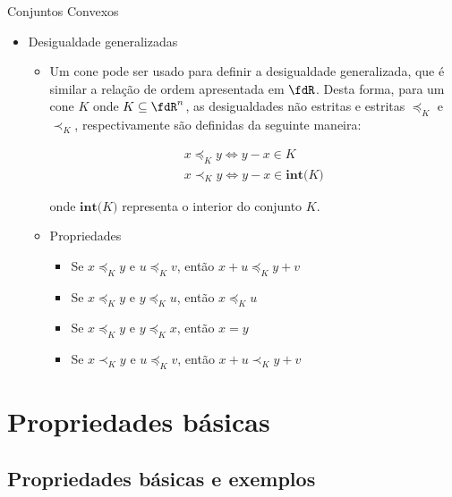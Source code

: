 \begin{frame}{Conjuntos Convexos}
  
  \begin{itemize} 
    \item Desigualdade generalizadas
    \begin{itemize}
      \item Um cone pode ser usado para definir a desigualdade generalizada, que é similar a relação de ordem apresentada em $\fdR$. Desta forma, para um cone $ K $ onde $ K \subseteq \fdR^n$, as desigualdades não estritas e estritas $ \preceq_{K}$ e $\prec_{K}$, respectivamente são definidas da seguinte maneira:
      
      \begin{subequations}
        \begin{align}
        x \preceq_{K} y \Leftrightarrow y - x \in K\\
        x \prec_{K} y \Leftrightarrow y - x \in \textbf{int(}K\textbf{)}
        \end{align}
      \end{subequations}
      
      onde $\textbf{int($K$)}$ representa o interior do conjunto $K$.
      
      \item Propriedades
      \begin{itemize}
        \item Se $x \preceq_{K} y$ e $u \preceq_{K} v$, então $ x + u \preceq_{K} y + v$
        \item  Se $x \preceq_{K} y$ e $y \preceq_{K} u$, então $ x \preceq_{K} u$
        \item  Se $x \preceq_{K} y$ e $y \preceq_{K} x$, então $ x = y$
        \item  Se $x \prec_{K} y$ e $u \preceq_{K} v$, então $ x + u \prec_{K} y + v$
      \end{itemize}
      
    \end{itemize}
    
  \end{itemize}
\end{frame}

\section{Propriedades básicas}

\subsection{Propriedades básicas e exemplos}

